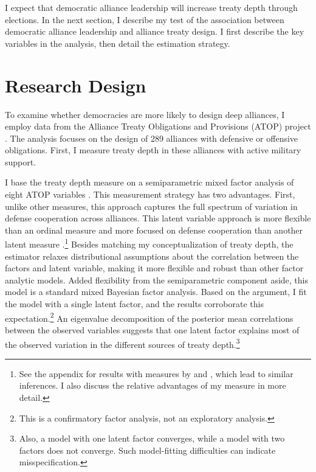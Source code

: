 \documentclass[12pt]{article}
\begin{document}
I expect that democratic alliance leadership will increase treaty depth through elections. 
In the next section, I describe my test of the association between democratic alliance leadership and alliance treaty design. 
I first describe the key variables in the analysis, then detail the estimation strategy.



\section{Research Design}



To examine whether democracies are more likely to design deep alliances, I employ data from the Alliance Treaty Obligations and Provisions (ATOP) project \citep{Leedsetal2002}. 
The analysis focuses on the design of 289 alliances with defensive or offensive obligations.
First, I measure treaty depth in these alliances with active military support. 


I base the treaty depth measure on a semiparametric mixed factor analysis of eight ATOP variables \citep{Murrayetal2013}.
This measurement strategy has two advantages. 
First, unlike other measures, this approach captures the full spectrum of variation in defense cooperation across alliances.
This latent variable approach is more flexible than an ordinal measure \citep{LeedsAnac2005} and more focused on defense cooperation than another latent measure \citep{BensonClinton2016}.\footnote{See the appendix for results with measures by \citet{LeedsAnac2005} and \citet{BensonClinton2016}, which lead to similar inferences. I also discuss the relative advantages of my measure in more detail.}
Besides matching my conceptualization of treaty depth, the estimator relaxes distributional assumptions about the correlation between the factors and latent variable, making it more flexible and robust than other factor analytic models. 
Added flexibility from the semiparametric component aside, this model is a standard mixed Bayesian factor analysis. 
Based on the argument, I fit the model with a single latent factor, and the results corroborate this expectation.\footnote{This is a confirmatory factor analysis, not an exploratory analysis.}
An eigenvalue decomposition of the posterior mean correlations between the observed variables suggests that one latent factor explains most of the observed variation in the different sources of treaty depth.\footnote{Also, a model with one latent factor converges, while a model with two factors does not converge. Such model-fitting difficulties can indicate misspecification.} 
\end{document}
